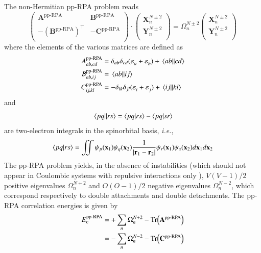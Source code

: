 \documentclass[aip,jcp,reprint,noshowkeys,superscriptaddress]{revtex4-1}
\newcommand{\ie}{\textit{i.e.}}
\newcommand{\T}[1]{#1^{\intercal}}
\newcommand{\br}{\mathbf{r}}
\newcommand{\bx}{\mathbf{x}}
\newcommand{\Nocc}{O}
\newcommand{\Nvir}{V}
\newcommand{\ppRPA}{\text{pp-RPA}}
\newcommand{\Ec}{E_\text{c}}
\newcommand{\e}[2]{\eps_{#1}^{#2}}
\newcommand{\Om}[2]{\Omega_{#1}^{#2}}
\newcommand{\SO}[1]{\psi_{#1}}
\newcommand{\bA}[2]{\mathbf{A}_{#1}^{#2}}
\newcommand{\bB}[2]{\mathbf{B}_{#1}^{#2}}
\newcommand{\bC}[2]{\mathbf{C}_{#1}^{#2}}
\newcommand{\bX}[2]{\mathbf{X}_{#1}^{#2}}
\newcommand{\bY}[2]{\mathbf{Y}_{#1}^{#2}}
\newcommand{\eps}{\varepsilon}
\begin{document}
The non-Hermitian pp-RPA problem reads \cite{Schuck_Book,vanAggelen_2013,Peng_2013,Scuseria_2013,Yang_2013,Yang_2013b,vanAggelen_2014,Yang_2014a,Zhang_2015,Zhang_2016}
\begin{equation}
\label{eq:LR-RPA}
	\begin{pmatrix}
		\bA{}{\ppRPA}			&	\bB{}{\ppRPA}	\\
		-\T{(\bB{}{\ppRPA})}	&	-\bC{}{\ppRPA}	\\
	\end{pmatrix}
	\cdot
	\begin{pmatrix}
		\bX{n}{N\pm2}	\\
		\bY{n}{N\pm2}	\\
	\end{pmatrix}
	=
	\Om{n}{N\pm2}
	\begin{pmatrix}
		\bX{n}{N\pm2}	\\
		\bY{n}{N\pm2}	\\
	\end{pmatrix}
\end{equation}
where the elements of the various matrices are defined as
\begin{subequations}
\begin{align}
	A_{ab,cd}^{\ppRPA} & = \delta_{ab} \delta_{cd} (\e{a}{} + \e{b}{}) + \mel{ab}{}{cd}
	\\ 
	B_{ab,ij}^{\ppRPA} & = \mel{ab}{}{ij}
	\\ 
	C_{ij,kl}^{\ppRPA} & = - \delta_{ik} \delta_{jl} (\e{i}{} + \e{j}{}) +\mel{ij}{}{kl}
\end{align}
\end{subequations}
and 
\begin{equation}
	\mel{pq}{}{rs} = \braket{pq}{rs} - \braket{pq}{sr}
\end{equation}
are two-electron integrals in the spinorbital basis, \ie,
\begin{equation}
	\braket{pq}{rs} = \iint \SO{p}(\bx_1) \SO{q}(\bx_2) \frac{1}{\abs{\br_1 - \br_2}} \SO{r}(\bx_1) \SO{s}(\bx_2)  d\bx_1 d\bx_2
\end{equation}
The pp-RPA problem yields, in the absence of instabilities (which should not appear in Coulombic systems with repulsive interactions only \cite{Scuseria_2013}), $\Nvir(\Nvir-1)/2$ positive eigenvalues $\Om{n}{N+2}$ and $\Nocc(\Nocc-1)/2$ negative eigenvalues $\Om{n}{N-2}$, which  correspond respectively to double attachments and double detachments.
The pp-RPA correlation energies is given by \cite{Peng_2013,Scuseria_2013}
\begin{equation}
\begin{split}
	\Ec^\ppRPA 
	& = + \sum_n \Om{n}{N+2} - \Tr(\bA{}{\ppRPA}) 
	\\
	& = - \sum_n \Om{n}{N-2} - \Tr(\bC{}{\ppRPA})
\end{split}
\end{equation}
\end{document}
